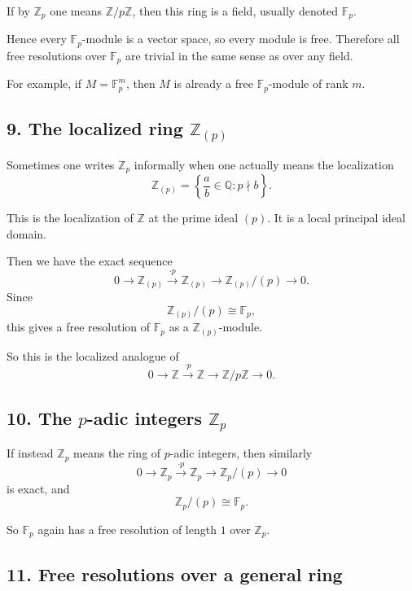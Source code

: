 \documentclass[12pt,a4paper]{article}
\theoremstyle{notespace}
\theoremstyle{definition}
\begin{document}
If by \(\mathbb Z_p\) one means \(\mathbb Z/p\mathbb Z\), then this ring is a field, usually denoted \(\mathbb F_p\).

Hence every \(\mathbb F_p\)-module is a vector space, so every module is free. Therefore all free resolutions over \(\mathbb F_p\) are trivial in the same sense as over any field.

For example, if \(M=\mathbb F_p^m\), then \(M\) is already a free \(\mathbb F_p\)-module of rank \(m\).

\subsection{9. The localized ring \(\mathbb Z_{(p)}\)}

Sometimes one writes \(\mathbb Z_p\) informally when one actually means the localization
\[
\mathbb Z_{(p)}=\left\{\frac{a}{b}\in \mathbb Q : p \nmid b\right\}.
\]

This is the localization of \(\mathbb Z\) at the prime ideal \((p)\). It is a local principal ideal domain.

Then we have the exact sequence
\[
0 \longrightarrow \mathbb Z_{(p)} \xrightarrow{\cdot p} \mathbb Z_{(p)} \longrightarrow \mathbb Z_{(p)}/(p) \longrightarrow 0.
\]
Since
\[
\mathbb Z_{(p)}/(p)\cong \mathbb F_p,
\]
this gives a free resolution of \(\mathbb F_p\) as a \(\mathbb Z_{(p)}\)-module.

So this is the localized analogue of
\[
0 \longrightarrow \mathbb Z \xrightarrow{\cdot p} \mathbb Z \longrightarrow \mathbb Z/p\mathbb Z \longrightarrow 0.
\]

\subsection{10. The \(p\)-adic integers \(\mathbb Z_p\)}

If instead \(\mathbb Z_p\) means the ring of \(p\)-adic integers, then similarly
\[
0 \longrightarrow \mathbb Z_p \xrightarrow{\cdot p} \mathbb Z_p \longrightarrow \mathbb Z_p/(p) \longrightarrow 0
\]
is exact, and
\[
\mathbb Z_p/(p)\cong \mathbb F_p.
\]

So \(\mathbb F_p\) again has a free resolution of length \(1\) over \(\mathbb Z_p\).

\subsection{11. Free resolutions over a general ring}
\end{document}
